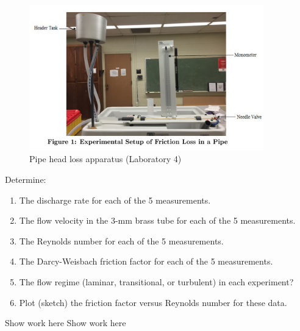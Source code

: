 \documentclass[12pt]{article}
\begin{document}
\begin{figure}[h!] %
   \centering
   \includegraphics[width=4in]{labsetup.png} 
   \caption{Pipe head loss apparatus (Laboratory 4)}
   \label{fig:labsetup}
\end{figure}

Determine:
\begin{enumerate}
\item The discharge rate for each of the 5 measurements.
\item The flow velocity in the 3-mm brass tube for each of the 5 measurements.
\item The Reynolds number for each of the 5 measurements.
\item The Darcy-Weisbach friction factor for each of the 5 measurements.
\item The flow regime (laminar, transitional, or turbulent) in each experiment?
\item Plot (sketch) the friction factor versus Reynolds number for these data.
\end{enumerate}
\clearpage
Show work here
\clearpage
Show work here
\clearpage
\end{document}
